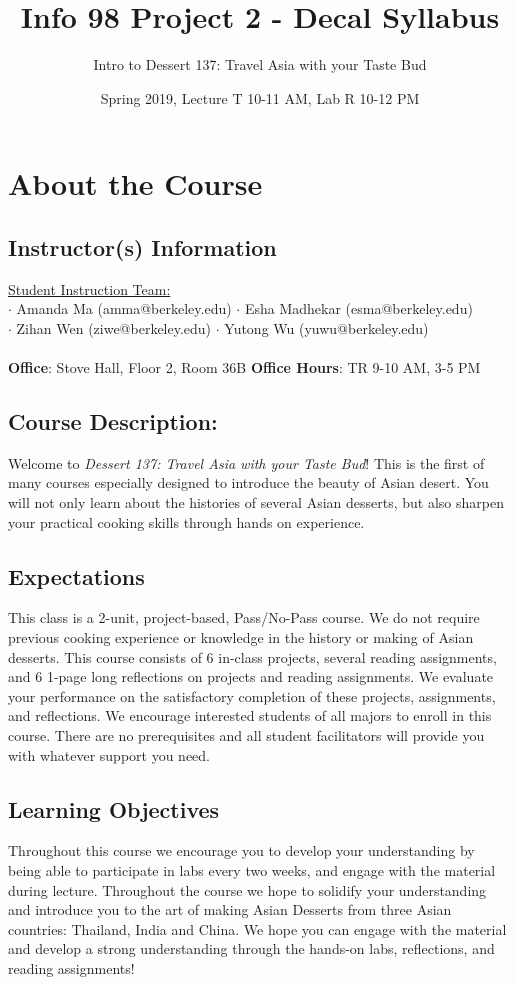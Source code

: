 \documentclass{article}
\title{Info 98 Project 2 - Decal Syllabus}
\author{Intro to Dessert 137: Travel Asia with your Taste Bud}
\date{\small Spring 2019, Lecture T 10-11 AM, Lab R 10-12 PM}
\begin{document}
\maketitle
\hrulefill
\section{About the Course}
\subsection{Instructor(s) Information}
\underline{Student Instruction Team:} \\
$\cdot$ Amanda Ma (amma@berkeley.edu) \phantom{space}
$\cdot$ Esha Madhekar (esma@berkeley.edu) \\
$\cdot$ Zihan Wen (ziwe@berkeley.edu) \phantom{.....space}
$\cdot$ Yutong Wu (yuwu@berkeley.edu) \\ \\
\textbf{Office}: Stove Hall, Floor 2, Room 36B \phantom{.....space}
\textbf{Office Hours}: TR 9-10 AM, 3-5 PM

\subsection{Course Description:}
Welcome to \textit{Dessert 137: Travel Asia with your Taste Bud}! This is the first of many courses especially designed to introduce the beauty of Asian desert. You will not only learn about the histories of several Asian desserts, but also sharpen your practical cooking skills through hands on experience. 

\subsection{Expectations}
This class is a 2-unit, project-based, Pass/No-Pass course. We do not require previous cooking experience or knowledge in the history or making of Asian desserts. This course consists of 6 in-class projects, several reading assignments, and 6 1-page long reflections on projects and reading assignments. We evaluate your performance on the satisfactory completion of these projects, assignments, and reflections.
We encourage interested students of all majors to enroll in this course. There are no prerequisites and all student facilitators will provide you with whatever support you need.

\subsection{Learning Objectives}
Throughout this course we encourage you to develop your understanding by being able to participate in labs every two weeks, and engage with the material during lecture. Throughout the course we hope to solidify your understanding and introduce you to the art of making Asian Desserts from three Asian countries: Thailand, India and China. We hope you can engage with the material and develop a strong understanding through the hands-on labs, reflections, and reading assignments!
\end{document}
